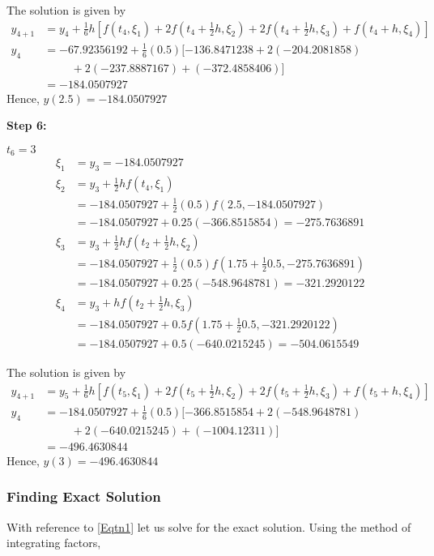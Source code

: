 \documentclass[12pt,a4paper]{article}
\begin{document}
The solution is given by 
\begin{align*}
y_{4+1} &= y_4 + \frac{1}{6}h\left[ f(t_4 , \xi_1 ) + 2f(t_4 + \frac{1}{2} h , \xi_2) + 2f(t_4 + \frac{1}{2} h , \xi_3 ) + f(t_4 + h , \xi_4) \right] \\
y_4 &= -67.92356192 + \frac{1}{6}(0.5)[ -136.8471238 + 2(-204.2081858) \\
&\hspace{1cm}+ 2( -237.8887167 ) + (-372.4858406)] \\
&= -184.0507927
\end{align*}
Hence, \quad $y(2.5) = -184.0507927 $

\noindent
\textbf{Step 6:}

$ t_6 = 3 $
\begin{align*}
\xi_1 &= y_3 = -184.0507927 \\
\xi_2 &= y_3 + \frac{1}{2}hf(t_4,\xi_1) \\
&= -184.0507927 + \frac{1}{2}(0.5)f(2.5,-184.0507927)\\
&= -184.0507927 + 0.25(-366.8515854) = -275.7636891 \\
\xi_3 &= y_3 + \frac{1}{2}hf\left( t_2 + \frac{1}{2}h, \xi_2 \right)  \\
&= -184.0507927 + \frac{1}{2}(0.5)f\left( 1.75 + \frac{1}{2}0.5, -275.7636891 \right)  \\
&= -184.0507927 + 0.25(-548.9648781) = -321.2920122  \\
\xi_4 &= y_3 + hf\left( t_2 + \frac{1}{2}h, \xi_3\right) \\
&= -184.0507927 + 0.5f\left( 1.75 + \frac{1}{2}0.5, -321.2920122\right) \\
&= -184.0507927 + 0.5(-640.0215245) = -504.0615549
\end{align*}

The solution is given by 
\begin{align*}
y_{4+1} &= y_5 + \frac{1}{6}h\left[ f(t_5 , \xi_1 ) + 2f(t_5 + \frac{1}{2} h , \xi_2) + 2f(t_5 + \frac{1}{2} h , \xi_3 ) + f(t_5 + h , \xi_4) \right] \\
y_4 &= -184.0507927 + \frac{1}{6}(0.5)[ -366.8515854 + 2(-548.9648781)\\
&\hspace{1cm} + 2( -640.0215245 ) + (-1004.12311)] \\
&= -496.4630844
\end{align*}
Hence, \quad $y(3) = -496.4630844 $

\subsubsection{Finding Exact Solution}
\noindent
With reference to \eqref{Eqtn1} let us solve for the exact solution. Using the method of integrating factors,
\end{document}
